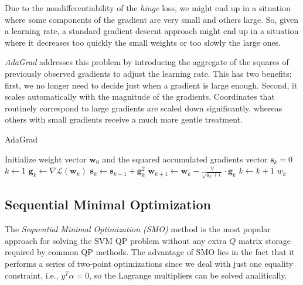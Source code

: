 Due to the nondifferentiability of the \emph{hinge} loss, we might end up in a situation where some components of the gradient are very small and others large. So, given a learning rate, a standard gradient descent approach might end up in a situation where it decreases too quickly the small weights or too slowly the large ones.

\emph{AdaGrad} \cite{duchi2011adaptive} addresses this problem by introducing the aggregate of the squares of previously observed gradients to adjust the learning rate. This has two benefits: first, we no longer need to decide just when a gradient is large enough. Second, it scales automatically with the magnitude of the gradients. Coordinates that routinely correspond to large gradients are scaled down significantly, whereas others with small gradients receive a much more gentle treatment.

\begin{algorithm}[H]
	\caption{AdaGrad}
	\label{alg:adagrad}
	\begin{algorithmic}
			\State Initialize weight vector $\textbf{w}_0$ and the squared accumulated gradients vector $\textbf{s}_k = 0$
			\State $k \gets 1$
				\State $\textbf{g}_k \gets \nabla \mathcal{L}(\textbf{w}_k)$
				\State $\textbf{s}_k \gets \textbf{s}_{k-1} + \textbf{g}_k^2$
				\State $\textbf{w}_{k+1} \gets \textbf{w}_k - \displaystyle \frac{\eta}{\sqrt{\textbf{s}_k + \epsilon}} \cdot \textbf{g}_k$
				\State $k \gets k + 1$
			\EndWhile
			\State \Return $w_k$
		\EndFunction
	\end{algorithmic}
\end{algorithm}

\subsection{Sequential Minimal Optimization}

The \emph{Sequential Minimal Optimization (SMO)} \cite{platt1998sequential} method is the most popular approach for solving the SVM QP problem without any extra $Q$ matrix storage required by common QP methods. The advantage of SMO lies in the fact that it performs a series of two-point optimizations since we deal with just one equality constraint, i.e., $y^T \alpha=0$, so the Lagrange multipliers can be solved analitically.

